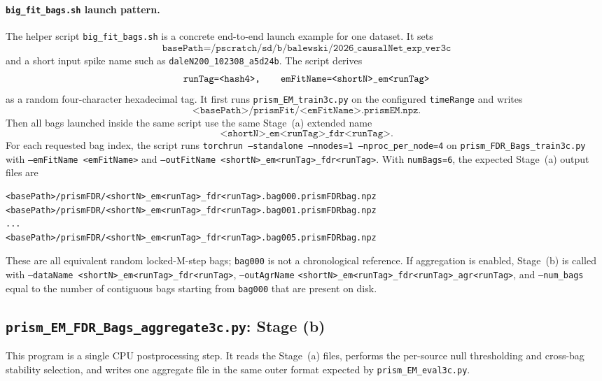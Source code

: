 \documentclass[11pt]{article}
\begin{document}
\paragraph{\texttt{big\_fit\_bags.sh} launch pattern.}
The helper script \texttt{big\_fit\_bags.sh} is a concrete end-to-end launch
example for one dataset. It sets
\[
\texttt{basePath=/pscratch/sd/b/balewski/2026\_causalNet\_exp\_ver3c}
\]
and a short input spike name such as
\texttt{daleN200\_102308\_a5d24b}. The script derives
\[
\texttt{runTag=<hash4>,\qquad emFitName=<shortN>\_em<runTag>}
\]
as a random four-character hexadecimal tag. It first runs
\texttt{prism\_EM\_train3c.py} on the configured \texttt{timeRange} and
writes
\[
\texttt{<basePath>/prismFit/<emFitName>.prismEM.npz}.
\]
Then all bags launched inside the same script use the same Stage~(a) extended
name
\[
\texttt{<shortN>\_em<runTag>\_fdr<runTag>}.
\]
For each requested bag index, the script runs
\texttt{torchrun --standalone --nnodes=1 --nproc\_per\_node=4} on
\texttt{prism\_FDR\_Bags\_train3c.py} with
\texttt{--emFitName <emFitName>} and
\texttt{--outFitName <shortN>\_em<runTag>\_fdr<runTag>}. With
\texttt{numBags=6}, the expected Stage~(a) output files are
\begin{verbatim}
<basePath>/prismFDR/<shortN>_em<runTag>_fdr<runTag>.bag000.prismFDRbag.npz
<basePath>/prismFDR/<shortN>_em<runTag>_fdr<runTag>.bag001.prismFDRbag.npz
...
<basePath>/prismFDR/<shortN>_em<runTag>_fdr<runTag>.bag005.prismFDRbag.npz
\end{verbatim}
These are all equivalent random locked-M-step bags; \texttt{bag000} is not a
chronological reference. If aggregation is enabled, Stage~(b) is called with
\texttt{--dataName <shortN>\_em<runTag>\_fdr<runTag>}, \texttt{--outAgrName}
\texttt{<shortN>\_em<runTag>\_fdr<runTag>\_agr<runTag>}, and
\texttt{--num\_bags} equal to the number of contiguous bags starting from
\texttt{bag000} that are present on disk.

\subsection{\texttt{prism\_EM\_FDR\_Bags\_aggregate3c.py}: Stage (b)}

This program is a single CPU postprocessing step. It reads the Stage~(a)
files, performs the per-source null thresholding and cross-bag stability
selection, and writes one aggregate file in the same outer format expected
by \texttt{prism\_EM\_eval3c.py}.
\end{document}
